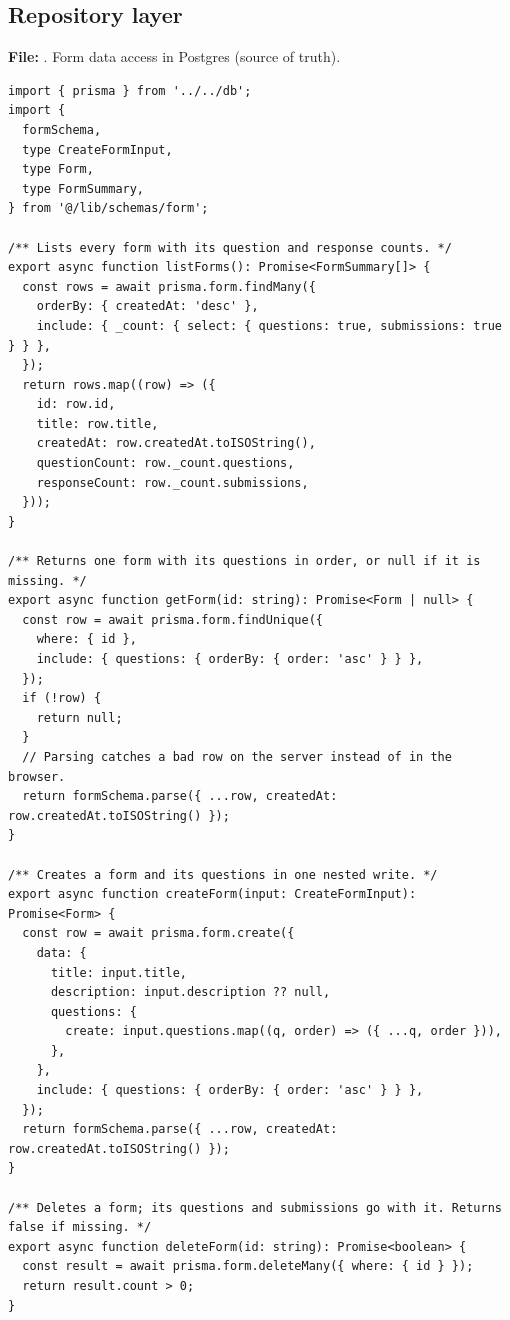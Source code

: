 \documentclass[11pt,a4paper]{article}
\begin{document}
\subsection{Repository layer}
\textbf{File:} . Form data access in Postgres (source of truth).\par
\begin{lstlisting}
import { prisma } from '../../db';
import {
  formSchema,
  type CreateFormInput,
  type Form,
  type FormSummary,
} from '@/lib/schemas/form';

/** Lists every form with its question and response counts. */
export async function listForms(): Promise<FormSummary[]> {
  const rows = await prisma.form.findMany({
    orderBy: { createdAt: 'desc' },
    include: { _count: { select: { questions: true, submissions: true } } },
  });
  return rows.map((row) => ({
    id: row.id,
    title: row.title,
    createdAt: row.createdAt.toISOString(),
    questionCount: row._count.questions,
    responseCount: row._count.submissions,
  }));
}

/** Returns one form with its questions in order, or null if it is missing. */
export async function getForm(id: string): Promise<Form | null> {
  const row = await prisma.form.findUnique({
    where: { id },
    include: { questions: { orderBy: { order: 'asc' } } },
  });
  if (!row) {
    return null;
  }
  // Parsing catches a bad row on the server instead of in the browser.
  return formSchema.parse({ ...row, createdAt: row.createdAt.toISOString() });
}

/** Creates a form and its questions in one nested write. */
export async function createForm(input: CreateFormInput): Promise<Form> {
  const row = await prisma.form.create({
    data: {
      title: input.title,
      description: input.description ?? null,
      questions: {
        create: input.questions.map((q, order) => ({ ...q, order })),
      },
    },
    include: { questions: { orderBy: { order: 'asc' } } },
  });
  return formSchema.parse({ ...row, createdAt: row.createdAt.toISOString() });
}

/** Deletes a form; its questions and submissions go with it. Returns false if missing. */
export async function deleteForm(id: string): Promise<boolean> {
  const result = await prisma.form.deleteMany({ where: { id } });
  return result.count > 0;
}
\end{lstlisting}
\end{document}
